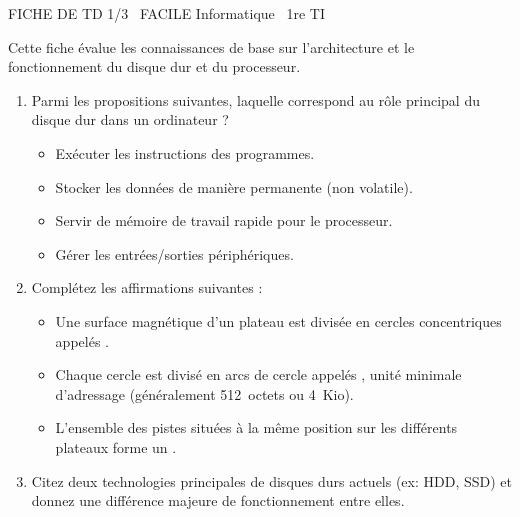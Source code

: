 \documentclass[11pt]{article}
\begin{document}
\begin{tcolorbox}[enhanced,colback=popink,colframe=popink,arc=10pt,boxrule=0pt,left=12pt,right=12pt,top=9pt,bottom=9pt]
{\color{white}\popxbold\small FICHE DE TD 1/3 \textbullet\ FACILE \hfill Informatique \textbullet\ 1re TI\par}
\end{tcolorbox}
\vspace{4pt}
Cette fiche évalue les connaissances de base sur l'architecture et le fonctionnement du disque dur et du processeur.

\begin{exercice}
\begin{enumerate}
    \item Parmi les propositions suivantes, laquelle correspond au rôle principal du disque dur dans un ordinateur ?
    \begin{itemize}
        \item[a)] Exécuter les instructions des programmes.
        \item[b)] Stocker les données de manière permanente (non volatile).
        \item[c)] Servir de mémoire de travail rapide pour le processeur.
        \item[d)] Gérer les entrées/sorties périphériques.
    \end{itemize}
    \item Complétez les affirmations suivantes :
    \begin{itemize}
        \item[a)] Une surface magnétique d'un plateau est divisée en cercles concentriques appelés \underline{\hspace{4cm}}.
        \item[b)] Chaque cercle est divisé en arcs de cercle appelés \underline{\hspace{4cm}}, unité minimale d'adressage (généralement \SI{512}{octets} ou \SI{4}{Kio}).
        \item[c)] L'ensemble des pistes situées à la même position sur les différents plateaux forme un \underline{\hspace{4cm}}.
    \end{itemize}
    \item Citez deux technologies principales de disques durs actuels (ex: HDD, SSD) et donnez une différence majeure de fonctionnement entre elles.
\end{enumerate}
\end{exercice}
\end{document}
